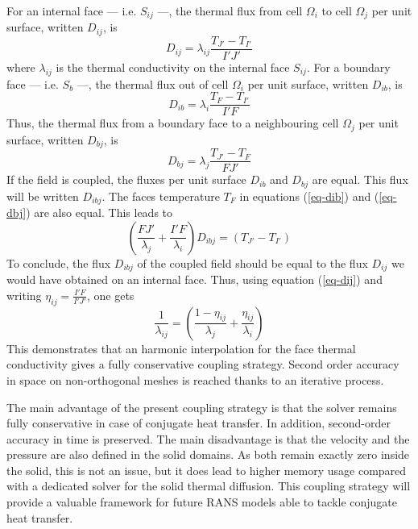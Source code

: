 \documentclass{svjour3}                     %
\begin{document}
For an internal face --- i.e. $S_{ij}$ ---, the thermal flux from cell $\Omega_i$ to cell $\Omega_j$ per unit surface, written $D_{ij}$, is
\begin{equation}
\label{eq-dij}
D_{ij} = \lambda_{ij} \frac{T_{J'}-T_{I'}}{I'J'}
\end{equation}
where $\lambda_{ij}$ is the thermal conductivity on the internal face $S_{ij}$.
For a boundary face --- i.e. $S_b$ ---, the thermal flux out of cell $\Omega_i$ per unit surface, written $D_{ib}$, is
\begin{equation}
\label{eq-dib}
D_{ib} = \lambda_i \frac{T_{F}-T_{I'}}{I'F}
\end{equation}
Thus, the thermal flux from a boundary face to a neighbouring cell $\Omega_j$ per unit surface, written $D_{bj}$, is
\begin{equation}
\label{eq-dbj}
D_{bj} = \lambda_j \frac{T_{J'}-T_{F}}{FJ'}
\end{equation}
If the field is coupled, the fluxes per unit surface $D_{ib}$ and $D_{bj}$ are equal.
This flux will be written $D_{ibj}$.
The faces temperature $T_F$ in equations (\ref{eq-dib}) and (\ref{eq-dbj}) are also equal.
This leads to
\begin{equation}
\left( \frac{F J'}{\lambda_j} + \frac{I' F}{\lambda_i} \right) D_{ibj} = \left( T_{J'}-T_{I'} \right)
\end{equation}
To conclude, the flux $D_{ibj}$ of the coupled field should be equal to the flux $D_{ij}$ we would have obtained on an internal face.
Thus, using equation (\ref{eq-dij}) and writing $\eta_{ij} = \frac{I' F}{I' J'}$, one gets
\begin{equation}
\frac{1}{\lambda_{ij}} = \left( \frac{1-\eta_{ij}}{\lambda_j} + \frac{\eta_{ij}}{\lambda_i} \right)
\end{equation}
This demonstrates that an harmonic interpolation for the face thermal conductivity gives a fully conservative coupling strategy.
Second order accuracy in space on non-orthogonal meshes is reached thanks to an iterative process.

The main advantage of the present coupling strategy is that the solver remains fully conservative in case of conjugate heat transfer.
In addition, second-order accuracy in time is preserved.
The main disadvantage is that the velocity and the pressure are also defined in the solid domains.
As both remain exactly zero inside the solid, this is not an issue, but it does lead to higher memory usage compared with a dedicated solver for the solid thermal diffusion.
This coupling strategy will provide a valuable framework for future RANS models able to tackle conjugate heat transfer.
\end{document}
